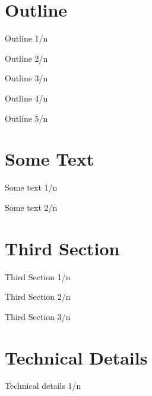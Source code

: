 \section{Outline}
\begin{frame}{Outline 1/n}
\blinditemize    
\end{frame}

\begin{frame}{Outline 2/n}
\blinditemize    
\end{frame}

\begin{frame}{Outline 3/n}
\blinditemize    
\end{frame}

\begin{frame}{Outline 4/n}
\blindenumerate
\end{frame}

\begin{frame}{Outline 5/n}
\blinddescription
\end{frame}

\section{Some Text}
\begin{frame}{Some text 1/n}
\blindtext    
\end{frame}

\begin{frame}{Some text 2/n}
\blindtext    
\end{frame}

\section{Third Section}
\begin{frame}{Third Section 1/n}
\blindenumerate    
\end{frame}    

\begin{frame}{Third Section 2/n}
\blindenumerate    
\end{frame}    

\begin{frame}{Third Section 3/n}
\blindenumerate    
\end{frame}    

\section{Technical Details}
\begin{frame}{Technical details 1/n}
\blindmathpaper
\end{frame}

